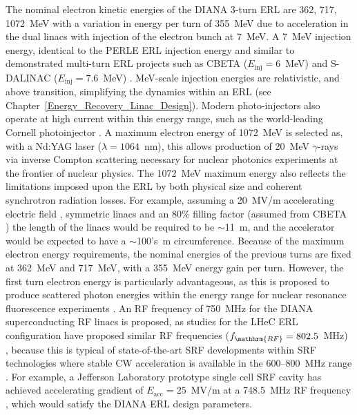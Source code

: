 \documentclass[../main.tex]{subfiles}
\begin{document}
The nominal electron kinetic energies of the DIANA 3-turn ERL are 362, 717, 1072~\si{\mega\electronvolt} with a variation in energy per turn of 355~\si{\mega\electronvolt} due to acceleration in the dual linacs with injection of the electron bunch at 7~\si{\mega\electronvolt}. A 7~\si{\mega\electronvolt} injection energy, identical to the PERLE \cite{angal2018perle} ERL injection energy and similar to demonstrated multi-turn ERL projects such as CBETA ($E_{\mathrm{inj}}=6$~\si{\mega\electronvolt}) \cite{bartnik2020cbeta} and S-DALINAC ($E_{\mathrm{inj}}=7.6$~\si{\mega\electronvolt}) \cite{arnold2018first}. \si{\mega\electronvolt}-scale injection energies are relativistic, and above transition, simplifying the dynamics within an ERL (see Chapter~\ref{Energy_Recovery_Linac_Design}). Modern photo-injectors also operate at high current within this energy range, such as the world-leading Cornell photoinjector \cite{bartnik2015operational}. A maximum electron energy of 1072~\si{\mega\electronvolt} is selected as, with a Nd:YAG laser ($\lambda=1064$~\si{\nano\meter}), this allows production of 20~\si{\mega\electronvolt} $\gamma$-rays via inverse Compton scattering necessary for nuclear photonics experiments\cite{budker2021expanding} at the frontier of nuclear physics. The 1072~\si{\mega\electronvolt} maximum energy also reflects the limitations imposed upon the ERL by both physical size and coherent synchrotron radiation losses. For example, assuming a 20~\si{\mega\volt}/\si{\meter} accelerating electric field \cite{ben2006review}, symmetric linacs and an 80\% filling factor (assumed from CBETA \cite{hoffstaetter2017cbeta}) the length of the linacs would be required to be $\sim$11~\si{\meter}, and the accelerator would be expected to have a $\sim$100's~\si{\meter} circumference. Because of the maximum electron energy requirements, the nominal energies of the previous turns are fixed at 362~\si{\mega\electronvolt} and 717~\si{\mega\electronvolt}, with a 355~\si{\mega\electronvolt} energy gain per turn. However, the first turn electron energy is particularly advantageous, as this is proposed to produce scattered photon energies within the energy range for nuclear resonance fluorescence experiments \cite{angell2015demonstration,quiter2011transmission}.          
An RF frequency of 750~\si{\mega\hertz} for the DIANA superconducting RF linacs is proposed, as studies for the LHeC ERL configuration have proposed similar RF frequencies ($f_{\mathhrm{RF}}=802.5$~\si{\mega\hertz}) \cite{agostini2021large}, because this is typical of state-of-the-art SRF developments within SRF technologies where stable CW acceleration is available in the 600--800~\si{\mega\hertz} range \cite{calaga2013proposal}. For example, a Jefferson Laboratory prototype single cell SRF cavity has achieved accelerating gradient of $E_{\mathrm{acc}}=25$~\si{\mega\volt}/\si{\meter} at a 748.5~\si{\mega\hertz} RF frequency \cite{rimmer2007jlab}, which would satisfy the DIANA ERL design parameters. 
\end{document}
